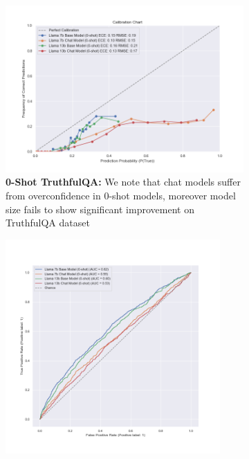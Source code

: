 \documentclass[11pt]{article}
\begin{document}
\begin{figure}
     \centering
     \begin{subfigure}[b]{0.60\textwidth}
         \centering \includegraphics[width=1.0\textwidth]{figures/0-shot-truthful_qa.png}
         \caption{\textbf{0-Shot TruthfulQA:} We note that chat models suffer from overconfidence in 0-shot models, moreover model size fails to show significant improvement on TruthfulQA dataset}
         \label{fig:0-shot-truthful_qa}
     \end{subfigure}
     \hfill
     \begin{subfigure}[b]{0.38\textwidth}
         \centering \includegraphics[width=0.9\textwidth]{figures/0-shot-truthful_qa-roc-roc.png}

\end{subfigure}
\end{figure}
\end{document}
